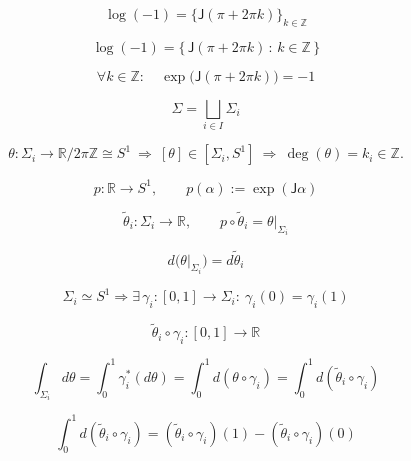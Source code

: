 \documentclass[12pt]{article}
\begin{document}
\begin{equation}
\log(-1)=\bigl\{\mathsf{J}(\pi+2\pi k)\bigr\}_{k\in\mathbb{Z}}
\end{equation}

\begin{equation}
\log(-1)=\bigl\{\,\mathsf{J}(\pi+2\pi k)\,:\,k\in\mathbb{Z}\,\bigr\}
\end{equation}

\begin{equation}
\forall k\in\mathbb{Z}:\quad \exp\!\big(\mathsf{J}(\pi+2\pi k)\big)=-1
\end{equation}

\begin{equation}
\Sigma=\bigsqcup_{i\in I}\Sigma_i
\end{equation}

\begin{equation}
\theta:\Sigma_i\to \mathbb{R}/2\pi\mathbb{Z}\cong S^1
\ \Longrightarrow\
[\theta]\in [\Sigma_i,S^1]
\ \Longrightarrow\
\deg(\theta)=k_i\in\mathbb{Z}.
\end{equation}

\begin{equation}
p:\mathbb{R}\to S^1,\qquad p(\alpha):=\exp(\mathsf{J}\alpha)
\end{equation}

\begin{equation}
\widetilde{\theta}_i:\Sigma_i\to\mathbb{R},\qquad
p\circ\widetilde{\theta}_i=\theta\big|_{\Sigma_i}
\end{equation}

\begin{equation}
d\big(\theta\big|_{\Sigma_i}\big)=d\widetilde{\theta}_i
\end{equation}

\begin{equation}
\Sigma_i\simeq S^1
\Longrightarrow
\exists\,\gamma_i:[0,1]\to \Sigma_i:\ \gamma_i(0)=\gamma_i(1)
\end{equation}

\begin{equation}
\widetilde{\theta}_i\circ\gamma_i:[0,1]\to\mathbb{R}
\end{equation}

\begin{equation}
\int_{\Sigma_i}d\theta
=\int_0^1\gamma_i^*(d\theta)
=\int_0^1 d(\theta\circ\gamma_i)
=\int_0^1 d(\widetilde{\theta}_i\circ\gamma_i)
\end{equation}

\begin{equation}
\int_0^1 d(\widetilde{\theta}_i\circ\gamma_i)
=(\widetilde{\theta}_i\circ\gamma_i)(1)-(\widetilde{\theta}_i\circ\gamma_i)(0)
\end{equation}
\end{document}
